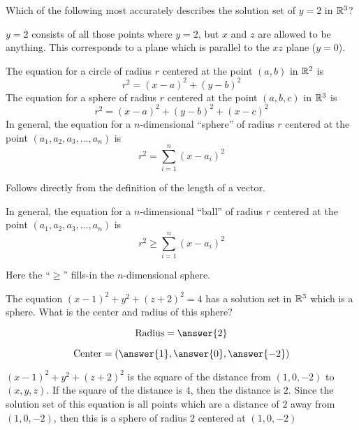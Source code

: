 \documentclass{ximera}
\begin{document}
\begin{question}
	Which of the following most accurately describes the solution
        set of $y=2$ in $\mathbb R^3$?
	
	\begin{multipleChoice}
	\end{multipleChoice}

\begin{hint}
	$y=2$ consists of all those points where $y=2$, but $x$ and
  $z$ are allowed to be anything.  This corresponds to a plane which
  is parallel to the $xz$ plane ($y=0$).
\end{hint}
	
\end{question}


\begin{theorem}
  The equation for a circle of radius $r$ centered at the point
  $(a,b)$ in $\mathbb R^2$ is
  \[
  r^2=(x-a)^2 + (y-b)^2
  \]
  The equation for a sphere of radius $r$ centered at the point
  $(a,b,c)$ in $\mathbb R^3$ is
  \[
  r^2 = (x-a)^2 + (y-b)^2 + (x-c)^2
  \]
  In general, the equation for a $n$-dimensional ``sphere'' of radius
  $r$ centered at the point $(a_1,a_2,a_3,\dots,a_n)$ is
  \[
  r^2 = \sum_{i=1}^n(x-a_i)^2
  \]
  \begin{explanation}
    Follows directly from the definition of the length of a vector. 
  \end{explanation}
\end{theorem}

\begin{corollary}
  In general, the equation for a $n$-dimensional ``ball'' of radius
  $r$ centered at the point $(a_1,a_2,a_3,\dots,a_n)$ is
  \[
  r^2 \ge \sum_{i=1}^n(x-a_i)^2
  \]
  \begin{explanation}
    Here the ``$\ge$'' fills-in the $n$-dimensional sphere.
  \end{explanation}
\end{corollary}


\begin{question}
	The equation $(x-1)^2+y^2+(z+2)^2 = 4$ has a solution set in
        $\mathbb R^3$ which is a sphere.  What is the center and
        radius of this sphere?
	
\[
\text{Radius} = \answer{2}
\]

\[
\text{Center} = \left(\answer{1},\answer{0}, \answer{-2} \right)
\]

\begin{hint}
	$(x-1)^2+y^2+(z+2)^2$ is the square of the distance from
  $(1,0,-2)$ to $(x,y,z)$.  If the square of the distance is $4$, then
  the distance is $2$.  Since the solution set of this equation is all
  points which are a distance of $2$ away from $(1,0,-2)$, then this
  is a sphere of radius $2$ centered at $(1,0,-2)$
\end{hint}
\end{question}
\end{document}

